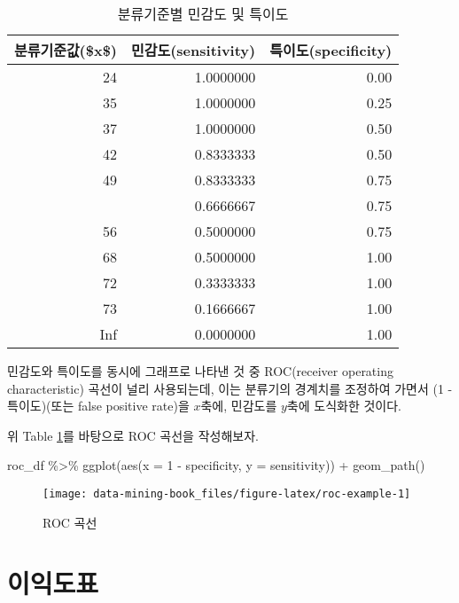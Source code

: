 \documentclass[
]{book}
\newenvironment{Shaded}{\begin{snugshade}}{\end{snugshade}}
\newcommand{\AttributeTok}[1]{\textcolor[rgb]{0.77,0.63,0.00}{#1}}
\newcommand{\DecValTok}[1]{\textcolor[rgb]{0.00,0.00,0.81}{#1}}
\newcommand{\FunctionTok}[1]{\textcolor[rgb]{0.00,0.00,0.00}{#1}}
\newcommand{\NormalTok}[1]{#1}
\newcommand{\SpecialCharTok}[1]{\textcolor[rgb]{0.00,0.00,0.00}{#1}}
\begin{document}
\begin{table}

\caption{\label{tab:roc-data}분류기준별 민감도 및 특이도}
\centering
\begin{tabular}[t]{rrr}
\toprule
분류기준값(\$x\$) & 민감도(sensitivity) & 특이도(specificity)\\
\midrule
24 & 1.0000000 & 0.00\\
35 & 1.0000000 & 0.25\\
37 & 1.0000000 & 0.50\\
42 & 0.8333333 & 0.50\\
49 & 0.8333333 & 0.75\\
\addlinespace
54 & 0.6666667 & 0.75\\
56 & 0.5000000 & 0.75\\
68 & 0.5000000 & 1.00\\
72 & 0.3333333 & 1.00\\
73 & 0.1666667 & 1.00\\
\addlinespace
Inf & 0.0000000 & 1.00\\
\bottomrule
\end{tabular}
\end{table}

민감도와 특이도를 동시에 그래프로 나타낸 것 중 ROC(receiver operating characteristic) 곡선이 널리 사용되는데, 이는 분류기의 경계치를 조정하여 가면서 (1 - 특이도)(또는 false positive rate)을 \(x\)축에, 민감도를 \(y\)축에 도식화한 것이다.

위 Table \ref{tab:roc-data}를 바탕으로 ROC 곡선을 작성해보자.

\begin{Shaded}
\begin{Highlighting}[]
\NormalTok{roc\_df }\SpecialCharTok{\%\textgreater{}\%}
  \FunctionTok{ggplot}\NormalTok{(}\FunctionTok{aes}\NormalTok{(}\AttributeTok{x =} \DecValTok{1} \SpecialCharTok{{-}}\NormalTok{ specificity, }\AttributeTok{y =}\NormalTok{ sensitivity)) }\SpecialCharTok{+}
  \FunctionTok{geom\_path}\NormalTok{()}
\end{Highlighting}
\end{Shaded}

\begin{figure}

{\centering \texttt{[image: data-mining-book\_files/figure-latex/roc-example-1]} 

}

\caption{ROC 곡선}\label{fig:roc-example}
\end{figure}

\hypertarget{gain-chart}{%
\section{이익도표}\label{gain-chart}}
\end{document}
